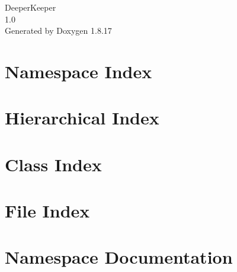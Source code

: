 \let\mypdfximage\pdfximage\def\pdfximage{\immediate\mypdfximage}\documentclass[twoside]{book}
\newcommand{\+}{\discretionary{\mbox{\scriptsize$\hookleftarrow$}}{}{}}
\newcommand{\clearemptydoublepage}{%
  \newpage{\pagestyle{empty}\cleardoublepage}%
}
\begin{document}
\hypersetup{pageanchor=false,
             bookmarksnumbered=true,
             pdfencoding=unicode
            }
\begin{titlepage}
\vspace*{7cm}
\begin{center}%
{\Large Deeper\+Keeper \\[1ex]\large 1.\+0 }\\
\vspace*{1cm}
{\large Generated by Doxygen 1.8.17}\\
\end{center}
\end{titlepage}
\clearemptydoublepage
{}
\tableofcontents
\clearemptydoublepage
{}
\hypersetup{pageanchor=true}

\chapter{Namespace Index}

\chapter{Hierarchical Index}

\chapter{Class Index}

\chapter{File Index}

\chapter{Namespace Documentation}





















\end{document}
